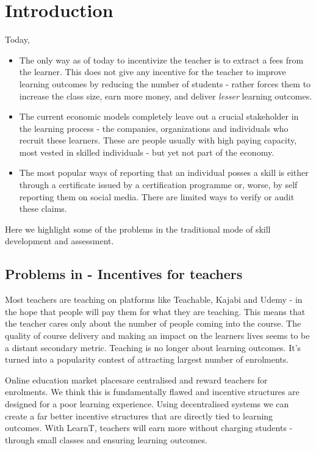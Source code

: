 \documentclass{article}
\begin{document}
  \section{Introduction}
    Today,
    \begin{itemize}
      \item The only way as of today to incentivize the teacher is to extract a fees from the learner. This does not give any incentive for the teacher to improve learning outcomes by reducing the number of students - rather forces them to increase the class size, earn more money, and deliver \textit{lesser} learning outcomes.
      \item The current economic models completely leave out a crucial stakeholder in the learning process - the companies, organizations and individuals who recruit these learners. These are people usually with high paying capacity, most vested in skilled individuals - but yet not part of the economy.
      \item The most popular ways of reporting that an individual posses a skill is either through a certificate issued by a certification programme or, worse, by self reporting them on social media. There are limited ways to verify or audit these claims.
    \end{itemize}
    Here we highlight some of the problems in the traditional mode of skill development and assessment. 
    \subsection{Problems in - Incentives for teachers}
      Most teachers are teaching on platforms like Teachable, Kajabi and Udemy - in the hope that people will pay them for what they are teaching. 
      This means that the teacher cares only about the number of people coming into the course. The quality of course delivery and making an impact on the learners lives seems to be a distant secondary metric. Teaching is no longer about learning outcomes. It's turned into a popularity contest of attracting largest number of enrolments. 
      \par
       Online education market placesare centralised and reward teachers for enrolments. We think this is fundamentally flawed and incentive structures are designed for a poor learning experience. 
       Using decentralised systems we can create a far better incentive structures that are directly tied to learning outcomes. 
       With LearnT, teachers will earn more without charging students - through small classes and ensuring learning outcomes.
     
\end{document}
